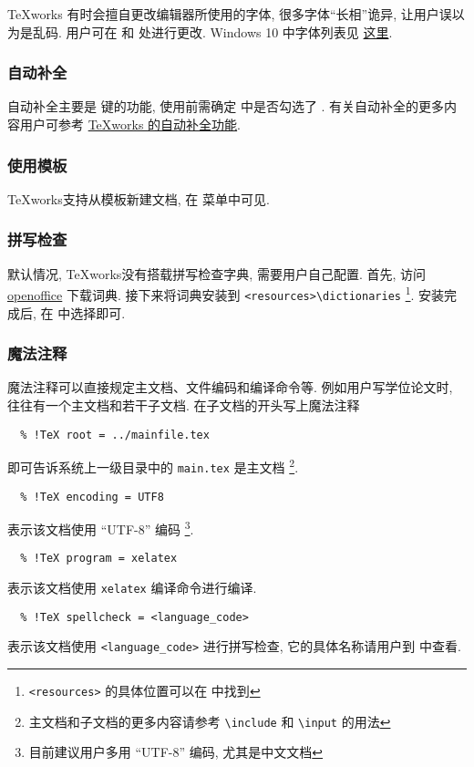 \TeX works 有时会擅自更改编辑器所使用的字体,
很多字体``长相''诡异,
让用户误以为是乱码.
用户可在 
和  处进行更改.
Windows 10 中字体列表见%
\href{https://docs.microsoft.com/en-us/typography/fonts/windows_10_font_list}{这里}.

\subsubsection{自动补全}

自动补全主要是  键的功能,
使用前需确定  中是否勾选了 . 
有关自动补全的更多内容用户可参考
\href{https://github.com/EthanDeng/texworks-autocomplete}{\TeX works 的自动补全功能}. 

\subsubsection{使用模板}

\TeX works支持从模板新建文档, 在  菜单中可见. 

\subsubsection{拼写检查}

默认情况, \TeX works没有搭载拼写检查字典, 需要用户自己配置. 
首先, 访问
\href{https://extensions.openoffice.org/}{openoffice}
下载词典. 
接下来将词典安装到
\texttt{<resources>\textbackslash dictionaries}%
\footnote{\texttt{<resources>} 的具体位置可以在
 中找到}. 
安装完成后, 在  中选择即可. 

\subsubsection{魔法注释}

魔法注释可以直接规定主文档、文件编码和编译命令等. 
例如用户写学位论文时, 往往有一个主文档和若干子文档. 
在子文档的开头写上魔法注释
\begin{lstlisting}
  % !TeX root = ../mainfile.tex
\end{lstlisting}
即可告诉系统上一级目录中的 \texttt{main.tex} 是主文档%
\footnote{主文档和子文档的更多内容请参考 \texttt{\textbackslash include}
和 \texttt{\textbackslash input} 的用法}. 
\begin{lstlisting}
  % !TeX encoding = UTF8
\end{lstlisting}
表示该文档使用 ``UTF-8'' 编码%
\footnote{目前建议用户多用 ``UTF-8'' 编码, 尤其是中文文档}. 
\begin{lstlisting}
  % !TeX program = xelatex
\end{lstlisting}
表示该文档使用 \texttt{xelatex} 编译命令进行编译. 
\begin{lstlisting}
  % !TeX spellcheck = <language_code>
\end{lstlisting}
表示该文档使用 \texttt{<language\_code>} 进行拼写检查,
它的具体名称请用户到  中查看. 

